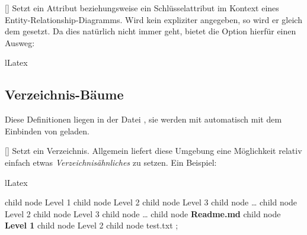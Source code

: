 %
%
%

[\cmdlist\secline{}]
Setzt ein Attribut beziehungsweise ein Schlüsselattribut im Kontext eines Entity-Relationship-Diagramms. Wird kein expliziter  angegeben, so wird er gleich dem  gesetzt. Da dies natürlich nicht immer geht, bietet die Option hierfür einen Ausweg:
\begin{defaultlst}[][listing side text,righthand width=3cm]{lLatex}
\end{defaultlst}


%
%
%

\subsection{Verzeichnis-Bäume}
Diese Definitionen liegen in der Datei , sie werden mit  automatisch mit dem Einbinden von  geladen.

%
%
%

[]
Setzt ein Verzeichnis. Allgemein liefert diese Umgebung eine Möglichkeit relativ einfach etwas \emph{Verzeichnisähnliches} zu setzen. Ein Beispiel:
\begin{defaultlst}[][listing side text,righthand width=4.5cm]{lLatex}
\begin{directory}[scale=0.5]
    child { node {Level 1}
        child { node {Level 2}
            child { node {Level 3} }
            child { node {\ldots} }
        }
        child { node {Level 2}
            child { node {Level 3} }
            child { node {\ldots} }
        }
        child { node {\bfseries Readme.md} }
    }
    child { node {\bfseries Level 1}
        child { node {Level 2}
                child {node {test.txt} } }
    };
\end{directory}
\end{defaultlst}

%
%
%

